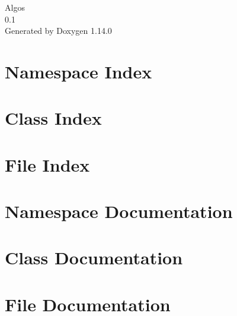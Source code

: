 \documentclass[twoside]{book}
\newcommand{\+}{\discretionary{\mbox{\scriptsize$\hookleftarrow$}}{}{}}
\newcommand{\clearemptydoublepage}{%
    \newpage{\pagestyle{empty}\cleardoublepage}%
  }
\begin{document}
  \raggedbottom
    \hypersetup{pageanchor=false,
                bookmarksnumbered=true,
                pdfencoding=unicode
               }
  \begin{titlepage}
  \vspace*{7cm}
  \begin{center}%
  {\Large Algos}\\
  [1ex]\large 0.\+1 \\
  \vspace*{1cm}
  {\large Generated by Doxygen 1.14.0}\\
  \end{center}
  \end{titlepage}
  \clearemptydoublepage
  \tableofcontents
  \clearemptydoublepage
  \hypersetup{pageanchor=true}
\chapter{Namespace Index}

\chapter{Class Index}

\chapter{File Index}

\chapter{Namespace Documentation}


\chapter{Class Documentation}



\chapter{File Documentation}



  \backmatter
  \newpage
  \clearemptydoublepage
  \printindex
\end{document}
